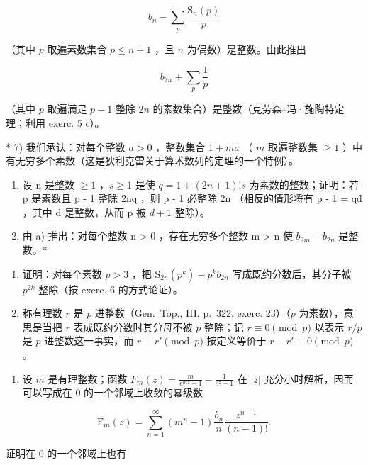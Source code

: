 \[
b _ {n} - \sum_ {p} \frac {\mathrm{S} _ {n} (p)}{p}
\]

（其中 \(p\) 取遍素数集合 \(p \leqslant n + 1\) ，且 \(n\) 为偶数）是整数。由此推出

\[
b _ {2 n} + \sum_ {p} \frac {1}{p}
\]

（其中 \(p\) 取遍满足 \(p - 1\) 整除 \(2n\) 的素数集合）是整数（克劳森–冯·施陶特定理；利用 exerc. 5 c）。

* 7) 我们承认：对每个整数 \(a > 0\) ，整数集合 \(1 + ma\) （ \(m\) 取遍整数集 \(\geqslant 1\) ）中有无穷多个素数（这是狄利克雷关于算术数列的定理的一个特例）。

\begin{enumerate}
\def\labelenumi{\alph{enumi})}
\item
  设 n 是整数 \(\geqslant 1\) ，\(s \geqslant 1\) 是使 \(q = 1 + (2n + 1)!s\) 为素数的整数；证明：若 p 是素数且 p - 1 整除 2nq ，则 p - 1 必整除 2n （相反的情形将有 p - 1 = qd ，其中 d 是整数，从而 p 被 \(d + 1\) 整除）。
\item
  由 a) 推出：对每个整数 n \textgreater{} 0 ，存在无穷多个整数 m \textgreater{} n 使 \(b_{2m} - b_{2n}\) 是整数。*
\end{enumerate}

\begin{enumerate}
\def\labelenumi{\arabic{enumi})}
\setcounter{enumi}{7}
\item
  证明：对每个素数 \(p > 3\) ，把 \(\mathrm{S}_{2n}(p^k) - p^k b_{2n}\) 写成既约分数后，其分子被 \(p^{2k}\) 整除（按 exerc. 6 的方式论证）。
\item
  称有理数 \(r\) 是 \(p\) 进整数（Gen.~Top., III, p.~322, exerc. 23）（\(p\) 为素数），意思是当把 \(r\) 表成既约分数时其分母不被 \(p\) 整除；记 \(r \equiv 0 \pmod{p}\) 以表示 \(r/p\) 是 \(p\) 进整数这一事实，而 \(r \equiv r' \pmod{p}\) 按定义等价于 \(r - r' \equiv 0 \pmod{p}\) 。
\end{enumerate}

\begin{enumerate}
\def\labelenumi{\alph{enumi})}
\tightlist
\item
  设 \(m\) 是有理整数；函数 \(F_{m}(z) = \frac{m}{e^{mz} - 1} - \frac{1}{e^{z} - 1}\) 在 \(|z|\) 充分小时解析，因而可以写成在 0 的一个邻域上收敛的幂级数
\end{enumerate}

\[
\mathrm{F} _ {m} (z) = \sum_ {n = 1} ^ {\infty} (m ^ {n} - 1) \frac {b _ {n}}{n} \frac {z ^ {n - 1}}{(n - 1) !}.
\]

证明在 0 的一个邻域上也有


